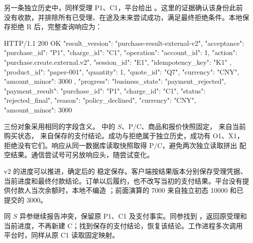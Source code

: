 另一条独立历史中，同样受理 P1、C1，平台给出 。这里的证据确认该身份此前没有收款，并排除所有已受理、在途及未来尝试成功，满足最终拒绝条件。本地保存拒绝 R 后，完整查询响应为：

\begin{BookCode}
HTTP/1.1 200 OK
{
  "result_version": "purchase-result-external-v2",
  "acceptance": {
    "purchase_id": "P1", "charge_id": "C1",
    "operation": {
      "account_id": 1,
      "action": "purchase.create.external.v2",
      "session_id": "E1", "idempotency_key": "K1"
    },
    "product_id": "paper-001", "quantity": 1,
    "quote_id": "Q7", "currency": "CNY",
    "amount_minor": 3000
  },
  "progress": {"business_state": "payment_rejected"},
  "payment_result": {
    "purchase_id": "P1", "charge_id": "C1",
    "status": "rejected_final", "reason": "policy_declined",
    "currency": "CNY", "amount_minor": 3000
  }
}
\end{BookCode}

三份对象采用相同的字段含义。 中的 \(S\)、P/C、商品和报价快照固定， 来自当前购买状态， 来自保存的支付结论。成功与拒绝属于独立历史，成功有 O1、X1，拒绝没有它们。响应从同一数据库读取快照取得 P/C，避免两次独立读取拼出  配空结果。通信尝试号可另放响应头，随尝试变化。

v2 的进度可以推进，确定后的  稳定保存。客户端按结果版本分别保存受理凭据、当前进度和最终付款结论。订单以后履约，也不改写当初的支付结果。平台没有提供付款人当次余额时，本地不编造 ；前面演算的 7000 来自独立初态 10000 和已提交的 3000。

同 \(S\) 异参继续报告冲突，保留原 P1、C1 及支付事实。同参找到 ，返回原受理和当前进度，不再新建 C；找到保存的支付结论，恢复该结论。工作进程多次调用平台时，同样从原 C1 读取固定映射。
